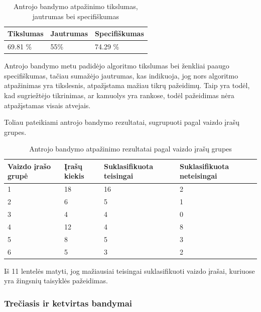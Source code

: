 \documentclass{VUMIFPSbakalaurinis}
\begin{document}
\begin{table}[H]\footnotesize
	\centering
	\caption{Antrojo bandymo atpažinimo tikslumas, jautrumas bei specifiškumas}
	{\begin{tabular}{|p{5cm}|p{5cm}|p{5cm}|} \hline
			\textbf{Tikslumas} & \textbf{Jautrumas} & \textbf{Specifiškumas} \\
			\hline
			69.81 \%  & 55\%    & 74.29 \%    \\
			
			\hline
	\end{tabular}}
	\label{tab:second_trial_percents}
\end{table}

Antrojo bandymo metu padidėjo algoritmo tikslumas bei ženkliai paaugo specifiškumas, tačiau sumažėjo jautrumas, kas indikuoja, jog nors algoritmo atpažinimas yra tikslesnis, atpažįstama mažiau tikrų pažeidimų. Taip yra todėl, kad sugriežtėjo tikrinimas, ar kamuolys yra rankose, todėl pažeidimas nėra atpažįstamas visais atvejais. 

Toliau pateikiami antrojo bandymo rezultatai, sugrupuoti pagal vaizdo įrašų grupes.

\begin{table}[H]\footnotesize
	\centering
	\caption{Antrojo bandymo atpažinimo rezultatai pagal vaizdo įrašų grupes}
	{\begin{tabular}{|p{3cm}|p{3cm}|p{3cm}|p{3cm}|} \hline
			\textbf{Vaizdo įrašo grupė} & \textbf{Įrašų kiekis} & \textbf{Suklasifikuota teisingai} & \textbf{Suklasifikuota neteisingai} \\
			\hline
			1  & 18    & 16    & 2    \\
			\hline
			2  & 6    & 5  & 1     \\
			\hline
			3  & 4    & 4   & 0    \\
			\hline
			4  & 12    & 4  & 8     \\
			\hline
			5  & 8    & 5  & 3     \\
			\hline
			6  & 5    & 3  & 2     \\
			\hline
	\end{tabular}}
	\label{tab:recognizion_results_grouped}
\end{table}

Iš 11 lentelės matyti, jog mažiausiai teisingai suklasifikuoti vaizdo įrašai, kuriuose yra žingsnių taisyklės pažeidimas.  

\subsubsection{Trečiasis ir ketvirtas bandymai}
\end{document}
